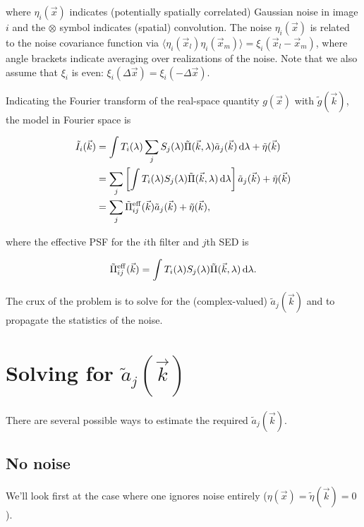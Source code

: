 \documentclass{article}
\begin{document}
where $\eta_i(\vec{x})$ indicates (potentially spatially correlated) Gaussian noise in image $i$ and
the $\otimes$ symbol indicates (spatial) convolution.  The noise $\eta_i(\vec{x})$ is related to the
noise covariance function via $\langle\eta_i(\vec{x}_l) \eta_i(\vec{x}_m)\rangle = \xi_i(\vec{x}_l -
\vec{x}_m)$, where angle brackets indicate averaging over realizations of the noise.  Note that we
also assume that $\xi_i$ is even: $\xi_i(\Delta\vec{x}) = \xi_i(-\Delta\vec{x})$.

Indicating the Fourier transform of the real-space quantity $g(\vec{x})$ with $\tilde{g}(\vec{k})$,
the model in Fourier space is

\begin{align}
    \tilde{I}_i(\vec{k})
    &= \int T_i(\lambda) \sum_j S_j(\lambda) \tilde{\Pi}(\vec{k}, \lambda) \tilde{a}_j(\vec{k}) \dif{\lambda} + \tilde{\eta}(\vec{k}) \\
    &= \sum_j \left[\int T_i(\lambda) S_j(\lambda) \tilde{\Pi}(\vec{k}, \lambda) \dif{\lambda}\right] \tilde{a}_j(\vec{k}) + \tilde{\eta}(\vec{k}) \\
    \label{eqn:solveme}
    &=  \sum_j \tilde{\Pi}^\mathrm{eff}_{ij}(\vec{k}) \tilde{a}_j(\vec{k}) + \tilde{\eta}(\vec{k}),
\end{align}

where the effective PSF for the $i$th filter and $j$th SED is

\begin{equation}
  \tilde{\Pi}^\mathrm{eff}_{ij}(\vec{k}) = \int T_i(\lambda) S_j(\lambda) \tilde{\Pi}(\vec{k}, \lambda) \dif{\lambda}.
\end{equation}

The crux of the problem is to solve for the (complex-valued) $\tilde{a}_j(\vec{k})$ and to propagate
the statistics of the noise.

\section{Solving for $\tilde{a}_j(\vec{k})$}

There are several possible ways to estimate the required $\tilde{a}_j(\vec{k})$.

\subsection{No noise}

We'll look first at the case where one ignores noise entirely ($\eta(\vec{x}) =
\tilde{\eta}(\vec{k})= 0$).
\end{document}
